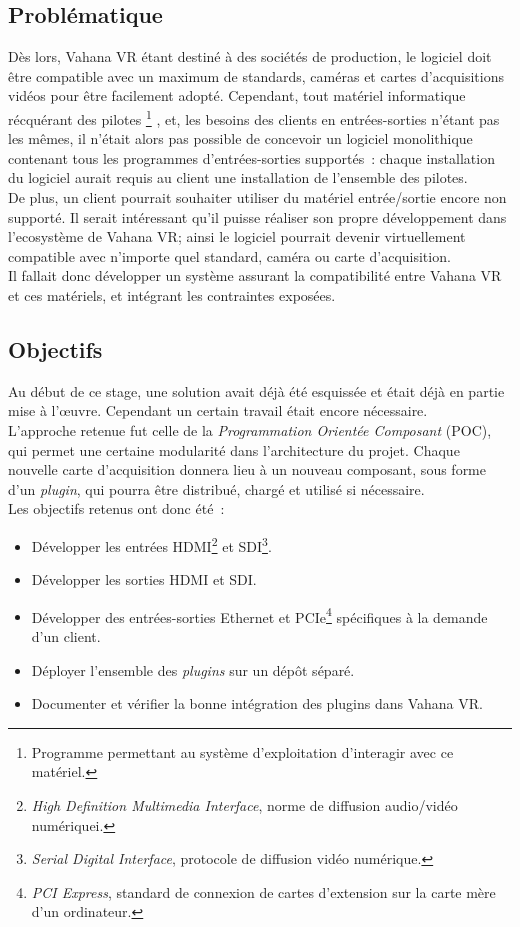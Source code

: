 \subsection{Problématique}
Dès lors, Vahana VR étant destiné à des sociétés de production, le logiciel doit
être compatible avec un maximum de standards, caméras et cartes d'acquisitions vidéos
pour être facilement adopté. Cependant, tout matériel informatique récquérant des pilotes
\footnote{Programme permettant au système d'exploitation d'interagir avec ce matériel\cite{pilote-informatique}.}
, et, les besoins des clients en entrées-sorties n'étant pas les mêmes, il n'était
alors pas possible de concevoir un logiciel monolithique contenant tous les programmes 
d'entrées-sorties supportés~: chaque installation du logiciel aurait requis au client 
une installation de l'ensemble des pilotes.\\
De plus, un client pourrait souhaiter utiliser du matériel entrée/sortie encore
non supporté. Il serait intéressant qu'il puisse réaliser son propre développement
dans l'ecosystème de Vahana VR; ainsi le logiciel pourrait devenir virtuellement
compatible avec n'importe quel standard, caméra ou carte d'acquisition.\\
Il fallait donc développer un système assurant la compatibilité
entre Vahana VR et ces matériels, et intégrant les contraintes exposées.\\

\subsection{Objectifs}
Au début de ce stage, une solution avait déjà été esquissée et était déjà en partie
mise à l'\oe uvre. Cependant un certain travail était encore nécessaire.\\
L'approche retenue fut celle de la \emph{Programmation Orientée Composant} (POC),
qui permet une certaine modularité dans l'architecture du projet\cite{poc}. Chaque nouvelle
carte d'acquisition donnera lieu à un nouveau composant, sous forme d'un \textit{plugin},
qui pourra être distribué, chargé et utilisé si nécessaire\cite{plugin}.\\
\newline
Les objectifs retenus ont donc été~:
\begin{itemize}
  \item Développer les entrées HDMI\footnote{\textit{High Definition Multimedia Interface}, 
  norme de diffusion audio/vidéo numériquei\cite{hdmi}.} et SDI\footnote{\textit{Serial Digital Interface}, 
  protocole de diffusion vidéo numérique\cite{sdi}.}.
  \item Développer les sorties HDMI et SDI.
  \item Développer des entrées-sorties Ethernet et PCIe\footnote{\textit{PCI Express}, standard
  de connexion de cartes d'extension sur la carte mère d'un ordinateur\cite{pci-express}.}
  spécifiques à la demande d'un client.
  \item Déployer l'ensemble des \textit{plugins} sur un dépôt séparé.
  \item Documenter et vérifier la bonne intégration des plugins dans Vahana VR.
\end{itemize}

